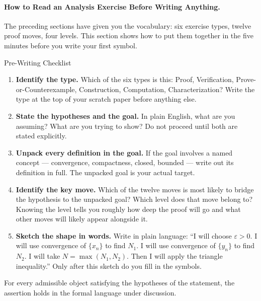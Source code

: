 \paragraph{How to Read an Analysis Exercise Before Writing Anything.}

The preceding sections have given you the vocabulary: six exercise types,
twelve proof moves, four levels. This section shows how to put them
together in the five minutes before you write your first symbol.

\begin{propositionbox}{Pre-Writing Checklist}
\begin{enumerate}[itemsep=4pt]
  \item \textbf{Identify the type.}
    Which of the six types is this: Proof, Verification,
    Prove-or-Counterexample, Construction, Computation, Characterization?
    Write the type at the top of your scratch paper before anything else.

  \item \textbf{State the hypotheses and the goal.}
    In plain English, what are you assuming? What are you trying to show?
    Do not proceed until both are stated explicitly.

  \item \textbf{Unpack every definition in the goal.}
    If the goal involves a named concept --- convergence, compactness,
    closed, bounded --- write out its definition in full.
    The unpacked goal is your actual target.

  \item \textbf{Identify the key move.}
    Which of the twelve moves is most likely to bridge the hypothesis
    to the unpacked goal? Which level does that move belong to?
    Knowing the level tells you roughly how deep the proof will go and
    what other moves will likely appear alongside it.

  \item \textbf{Sketch the shape in words.}
    Write in plain language: ``I will choose $\varepsilon > 0$.
    I will use convergence of $\{x_n\}$ to find $N_1$. I will use
    convergence of $\{y_n\}$ to find $N_2$. I will take
    $N = \max(N_1, N_2)$. Then I will apply the triangle inequality.''
    Only after this sketch do you fill in the symbols.
\end{enumerate}
\end{propositionbox}
\begin{remark*}
For every admissible object satisfying the hypotheses of the statement, the
assertion holds in the formal language under discussion.
\end{remark*}

